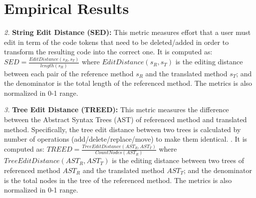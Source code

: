 \section{Empirical Results}
\emph{2.} \textbf{String Edit Distance (SED):} This metric measures
effort that a user must edit in term of the code tokens
that need to be deleted/added in order to transform the
resulting code into the correct one. It is computed as:  $SED = \frac{EditDistance\left(s_R, s_T\right)}{length\left(s_R\right)}$ where $EditDistance\left(s_R, s_T\right)$ is the editing distance between each pair of the reference method $s_R$ and the translated method $s_T$; and the denominator is the total length of the referenced method. The metrics is also normalized in 0-1 range.

\emph{3.} \textbf{Tree Edit Distance (TREED):} This metric measures the difference between the Abstract Syntax Trees (AST) of referenced method and translated method. Specifically, the tree edit distance between two trees is calculated by number of operations (add/delete/replace/move) to make them identical. \cite{algorithm}. 
It is computed as:  $TREED = \frac{TreeEditDistance\left(AST_R, AST_T\right)}{CountNodes \left(AST_R\right)}$ where $TreeEditDistance\left(AST_R, AST_T\right)$ is the editing distance between two trees of referenced method $AST_R$ and the translated method $AST_T$; and the denominator is the total nodes in the tree of the referenced method.  The metrics is also normalized in 0-1 range.